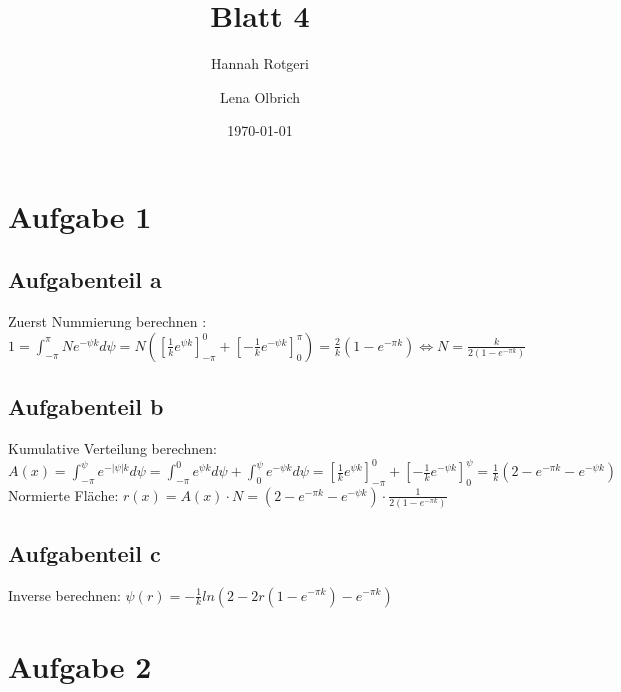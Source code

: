 \documentclass[11pt,a4paper]{article}
\title{Blatt 4}
\date{\today}
\author{Hannah Rotgeri \and Lena Olbrich}
\begin{document}
    \maketitle

    \section*{Aufgabe 1}
\subsection{Aufgabenteil a}
Zuerst Nummierung berechnen :
$1= \int_{-\pi}^{\pi} N e^{-\psi k} d\psi= N \left( [\frac{1}{k}e^{\psi k}]^0_{-\pi} + [-\frac{1}{k}e^{-\psi k}]^\pi_{0}\right)=\frac{2}{k}(1-e^{-\pi k}) \Leftrightarrow N=\frac{k}{2(1-e^{-\pi k})}
$

\subsection{Aufgabenteil b}
Kumulative Verteilung berechnen:
$A(x)=\int_{-\pi}^{\psi}e^{-|\psi|k}d\psi=
\int_{-\pi}^{0} e^{\psi k} d \psi + \int_{0}^{\psi} e^{-\psi k} d \psi
= [\frac{1}{k} e^{\psi k}]^0_{-\pi} +[-\frac{1}{k}e^{-\psi k}]^\psi_0
=\frac{1}{k}\left(2- e^{-\pi k} - e^{-\psi k} \right)
$\\
Normierte Fläche:
$r(x)= A(x)\cdot N = \left(2- e^{-\pi k} - e^{-\psi k} \right) \cdot \frac{1}{2(1-e^{-\pi k})}
$
\subsection{Aufgabenteil c}
Inverse berechnen:
$ \psi(r)=-\frac{1}{k}ln(2-2r(1-e^{-\pi k})-e^{-\pi k})
$
	\section*{Aufgabe 2}
\end{document}
